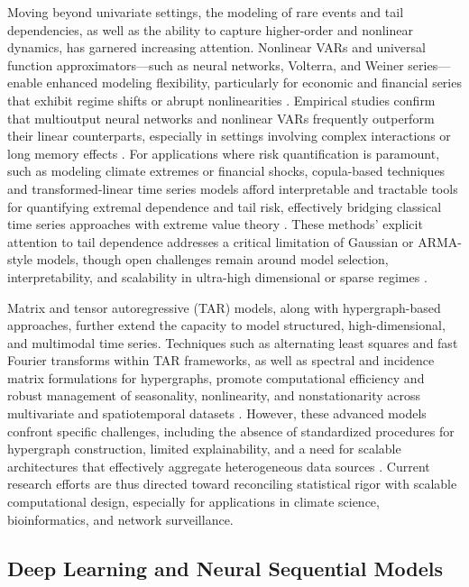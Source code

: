 \documentclass[sigconf]{acmart}
\begin{document}
Moving beyond univariate settings, the modeling of rare events and tail dependencies, as well as the ability to capture higher-order and nonlinear dynamics, has garnered increasing attention. Nonlinear VARs and universal function approximators—such as neural networks, Volterra, and Weiner series—enable enhanced modeling flexibility, particularly for economic and financial series that exhibit regime shifts or abrupt nonlinearities \cite{ref56, ref67}. Empirical studies confirm that multioutput neural networks and nonlinear VARs frequently outperform their linear counterparts, especially in settings involving complex interactions or long memory effects \cite{ref67}. For applications where risk quantification is paramount, such as modeling climate extremes or financial shocks, copula-based techniques and transformed-linear time series models afford interpretable and tractable tools for quantifying extremal dependence and tail risk, effectively bridging classical time series approaches with extreme value theory \cite{ref49, ref50, ref58, ref59}. These methods' explicit attention to tail dependence addresses a critical limitation of Gaussian or ARMA-style models, though open challenges remain around model selection, interpretability, and scalability in ultra-high dimensional or sparse regimes \cite{ref49, ref58}.

Matrix and tensor autoregressive (TAR) models, along with hypergraph-based approaches, further extend the capacity to model structured, high-dimensional, and multimodal time series. Techniques such as alternating least squares and fast Fourier transforms within TAR frameworks, as well as spectral and incidence matrix formulations for hypergraphs, promote computational efficiency and robust management of seasonality, nonlinearity, and nonstationarity across multivariate and spatiotemporal datasets \cite{ref8, ref12, ref18, ref49, ref50, ref52, ref58, ref59, ref61, ref65}. However, these advanced models confront specific challenges, including the absence of standardized procedures for hypergraph construction, limited explainability, and a need for scalable architectures that effectively aggregate heterogeneous data sources \cite{ref52, ref59}. Current research efforts are thus directed toward reconciling statistical rigor with scalable computational design, especially for applications in climate science, bioinformatics, and network surveillance.

\subsection{Deep Learning and Neural Sequential Models}
\end{document}
